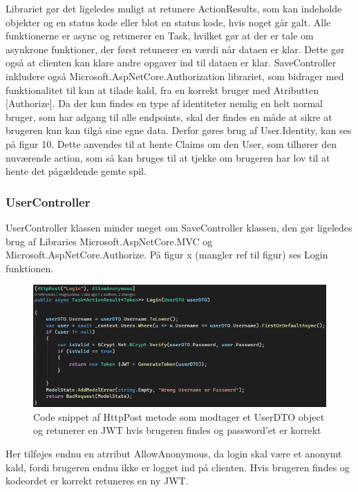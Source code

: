Librariet gør det ligeledes muligt at retunere ActionResults, som kan indeholde objekter og en status kode eller blot en status kode, hvis noget går galt. Alle funktionerne er async og retunerer en Task, hvilket gør at der er tale om asynkrone funktioner, der først retunerer en værdi når dataen er klar. Dette gør også at clienten kan klare andre opgaver ind til dataen er klar.
SaveController inkludere også Microsoft.AspNetCore.Authorization librariet, som bidrager med funktionalitet til kun at tilade kald, fra en korrekt bruger med Atributten [Authorize]. Da der kun findes en type af identiteter nemlig en helt normal bruger, som har adgang til alle endpoints, skal der findes en måde at sikre at brugeren kun kan tilgå sine egne data. Derfor gøres brug af User.Identity, kan ses på figur 10. Dette anvendes til at hente Claims om den User, som tilhører den nuværende action, som så kan bruges til at tjekke om brugeren har lov til at hente det pågældende gemte spil.\\
    

\subsubsection{UserController}

UserController klassen minder meget om SaveController klassen, den gør ligeledes brug af Libraries Microsoft.AspNetCore.MVC og Microsoft.AspNetCore.Authorize. På figur x (mangler ref til figur) ses Login funktionen.

\begin{figure}[H]
\centering
\includegraphics[width = \textwidth]{02-Body/Images/Backend_Code_Login.PNG}
\caption{Code snippet af HttpPost metode som modtager et UserDTO object og retunerer en JWT hvis brugeren findes og password’et er korrekt}
\label{fig:Implementering-Backend-Code-Lgoin}
\end{figure}

Her tilføjes endnu en atrribut AllowAnonymous, da login skal være et anonymt kald, fordi brugeren endnu ikke er logget ind på clienten. Hvis brugeren findes og kodeordet er korrekt retuneres en ny JWT.\\

